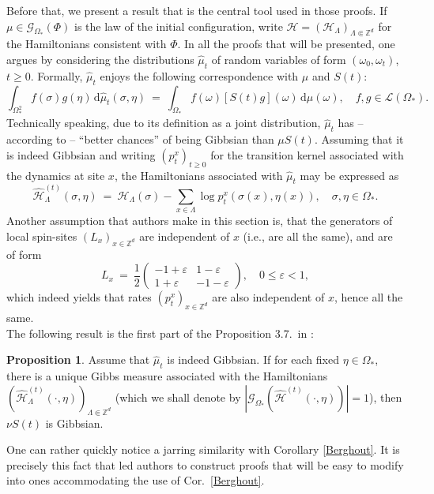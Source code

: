 \documentclass[12pt]{article}
\renewcommand{\d}{\mathrm{d}}
\newcommand{\G}{\mathcal{G}}
\renewcommand{\H}{\mathcal{H}}
\newcommand{\Loc}{\mathcal{L}}
\newcommand{\Z}{\mathbb{Z}}
\newcommand{\pika}{\boldsymbol{\cdot}}
\newcommand{\1}{\mathbbm{1}}
\newcommand{\5}{\vspace{0.5cm}}
\renewcommand{\hat}{\widehat}
\theoremstyle{definition}
\newtheorem{prop}[thm]{Proposition}
\begin{document}
Before that, we present a result that is the central tool used in those proofs. If $\mu\in\G_{\Omega_*}(\Phi)$ is the law of the initial configuration, write $\H=(\H_\Lambda)_{\Lambda\Subset\Z^d}$ for the Hamiltonians consistent with $\Phi$. In all the proofs that will be presented, one argues by considering the distributions $\hat{\mu}_t$ of random variables of form $(\omega_0,\omega_t)$, $t\geq 0$. Formally, $\hat{\mu}_t$ enjoys the following correspondence with $\mu$ and $S(t)$:
$$\int_{\Omega_*^2} f(\sigma)g(\eta)\,\d\hat{\mu}_t(\sigma,\eta) ~=~ \int_{\Omega_*}f(\omega)[S(t)g](\omega)\,\d\mu(\omega), \quad f,g\in\Loc(\Omega_*).$$
Technically speaking, due to its definition as a joint distribution, $\hat{\mu}_t$ has -- according to \cite{EFHR} -- ``better chances'' of being Gibbsian than $\mu S(t)$. Assuming that it is indeed Gibbsian and writing $(p_t^x)_{t\geq 0}$ for the transition kernel associated with the dynamics at site $x$, the Hamiltonians associated with $\hat{\mu}_t$ may be expressed as
$$\hat{\H}_\Lambda^{(t)}(\sigma,\eta) ~=~ \H_\Lambda(\sigma) - \sum_{x\in\Lambda}\log p_t^x(\sigma(x),\eta(x)), \quad \sigma,\eta\in\Omega_*.$$
Another assumption that authors make in this section is, that the generators of local spin-sites $(L_x)_{x\in\Z^d}$ are independent of $x$ (i.e., are all the same), and are of form
$$L_x ~=~ \frac{1}{2}\begin{pmatrix}
-1+\varepsilon & 1-\varepsilon \\
1+\varepsilon & -1-\varepsilon
\end{pmatrix}, \quad 0\leq \varepsilon<1,$$
which indeed yields that rates $(p_t^x)_{x\in\Z^d}$ are also independent of $x$, hence all the same.\\

The following result is the first part of the Proposition 3.7.~in \cite{EFHR}:
\begin{prop}\label{BerghoutAnalogue}
Assume that $\hat{\mu}_t$ is indeed Gibbsian. If for each fixed $\eta\in\Omega_*$, there is a unique Gibbs measure associated with the Hamiltonians $(\hat{\H}_\Lambda^{(t)}(\pika,\eta))_{\Lambda\Subset\Z^d}$ (which we shall denote by $|\G_{\Omega_*}(\hat{\H}^{(t)}(\pika,\eta))|=1$), then $\nu S(t)$ is Gibbsian.
\end{prop}
One can rather quickly notice a jarring similarity with Corollary \ref{Berghout}. It is precisely this fact that led authors to construct proofs that will be easy to modify into ones accommodating the use of Cor.~\ref{Berghout}. \\
\end{document}
